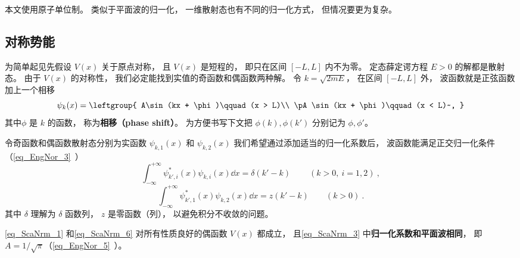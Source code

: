 
\begin{issues}
\issueTODO
\end{issues}

本文使用原子单位制。 类似于平面波的归一化， 一维散射态也有不同的归一化方式， 但情况要更为复杂。

\subsection{对称势能}
为简单起见先假设 $V(x)$ 关于原点对称， 且 $V(x)$ 是短程的， 即只在区间 $[-L,L]$ 内不为零。 定态薛定谔方程 $E > 0$ 的解都是散射态。 由于 $V(x)$ 的对称性， 我们必定能找到实值的奇函数和偶函数两种解。 令 $k = \sqrt{2mE}$， 在区间 $[-L,L]$ 外， 波函数就是正弦函数加上一个相移
\begin{equation}\label{eq_ScaNrm_3}
\psi_k(x) = \leftgroup{
    A\sin(kx + \phi)\qquad (x > L)\\
    \pA\sin(kx + \phi)\qquad (x < L)~,
}\end{equation}
其中$\phi$ 是 $k$ 的函数， 称为\textbf{相移（phase shift）}。 为方便书写下文把 $\phi(k),\phi(k')$ 分别记为 $\phi, \phi'$。

令奇函数和偶函数散射态分别为实函数 $\psi_{k,1}(x)$ 和 $\psi_{k,2}(x)$ 我们希望通过添加适当的归一化系数后， 波函数能满足正交归一化条件（\autoref{eq_EngNor_3}~）
\begin{equation}\label{eq_ScaNrm_1}
\int_{-\infty}^{+\infty} \psi_{k',i}^*(x) \psi_{k,i}(x) \dd{x} = \delta(k' - k)~\qquad (k > 0,\ i = 1, 2)~,
\end{equation}
\begin{equation}\label{eq_ScaNrm_6}
\int_{-\infty}^{+\infty} \psi_{k',1}^*(x) \psi_{k,2}(x) \dd{x} = z(k' - k) \qquad (k > 0)~.
\end{equation}
其中 $\delta$ 理解为 $\delta$ 函数列， $z$ 是零函数（列）， 以避免积分不收敛的问题。

\begin{theorem}{}\label{the_ScaNrm_1}
\autoref{eq_ScaNrm_1} 和\autoref{eq_ScaNrm_6} 对所有性质良好的偶函数 $V(x)$ 都成立， 且\autoref{eq_ScaNrm_3} 中\textbf{归一化系数和平面波相同}， 即 $A = 1/\sqrt{\pi}$（\autoref{eq_EngNor_5}~）。
\end{theorem}

